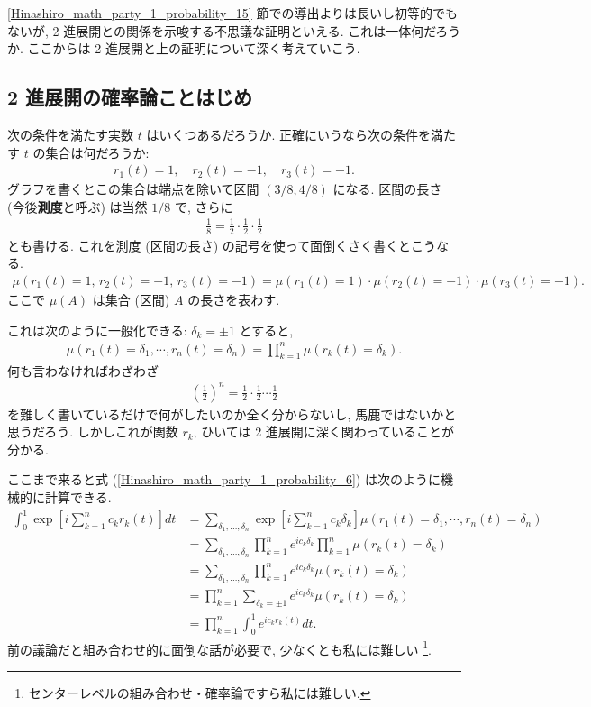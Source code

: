 \documentclass[openany, a4paper, oneside]{jsbook}
\theoremstyle{break}
\theoremstyle{breakdefn}
\newcommand{\rbk}[1]{\left (#1\right)}
\newcommand{\sqbk}[1]{\left[#1\right]}
\begin{document}
\ref{Hinashiro_math_party_1_probability_15} 節での導出よりは長いし初等的でもないが, 2 進展開との関係を示唆する不思議な証明といえる.
これは一体何だろうか.
ここからは 2 進展開と上の証明について深く考えていこう.
\subsection{2 進展開の確率論ことはじめ \label{Hinashiro_math_party_1_probability_14}}


次の条件を満たす実数 $t$ はいくつあるだろうか.
正確にいうなら次の条件を満たす $t$ の集合は何だろうか:
\begin{align}
 r_1 (t) = 1,
 \quad r_2 (t) = -1,
 \quad r_3 (t) = -1.
\end{align}
グラフを書くとこの集合は端点を除いて区間 $\rbk{3/8, 4/8}$ になる.
区間の長さ (今後\textbf{測度}と呼ぶ) は当然 $1/8$ で, さらに
\begin{align}
 \frac{1}{8}
 =
 \frac{1}{2} \cdot \frac{1}{2} \cdot \frac{1}{2}
\end{align}
とも書ける.
これを測度 (区間の長さ) の記号を使って面倒くさく書くとこうなる.
\begin{align}
 \mu \rbk{r_1 (t) = 1, \, r_2 (t) = -1, \, r_3 (t) = -1}
 =
 \mu \rbk{r_1 (t)=1} \cdot \mu \rbk{r_2 (t)=-1} \cdot \mu \rbk{r_3 (t)=-1}.
\end{align}
ここで $\mu (A)$ は集合 (区間) $A$ の長さを表わす.

これは次のように一般化できる: $\delta_k = \pm 1$ とすると,
\begin{align}
 \mu \rbk{r_1 (t) = \delta_1, \cdots, r_n (t) = \delta_n}
 =
 \prod_{k=1}^{n} \mu \rbk{r_k (t)=\delta_k}. \label{Hinashiro_math_party_1_probability_7}
\end{align}
何も言わなければわざわざ
\begin{align}
 \rbk{\frac{1}{2}}^n
 =
 \frac{1}{2} \cdot \frac{1}{2} \cdots \frac{1}{2}
\end{align}
を難しく書いているだけで何がしたいのか全く分からないし, 馬鹿ではないかと思うだろう.
しかしこれが関数 $r_k$, ひいては 2 進展開に深く関わっていることが分かる.

ここまで来ると式 (\ref{Hinashiro_math_party_1_probability_6}) は次のように機械的に計算できる.
\begin{align}
 \int_0^1 \exp \sqbk{i \sum_{k=1}^n c_k r_k (t)} dt
 &=
 \sum_{\delta_1,\dots,\delta_n} \exp \sqbk{i \sum_{k=1}^{n} c_k \delta_k} \mu \rbk{r_1 (t) = \delta_1, \cdots, r_n (t) = \delta_n} \\
 &=
 \sum_{\delta_1,\dots,\delta_n} \prod_{k=1}^n e^{i c_k \delta_k} \prod_{k=1}^n \mu \rbk{r_k (t) = \delta_k} \\
 &=
 \sum_{\delta_1,\dots,\delta_n} \prod_{k=1}^n e^{i c_k \delta_k} \mu \rbk{r_k (t) = \delta_k} \\
 &=
 \prod_{k=1}^n \sum_{\delta_k = \pm 1} e^{i c_k \delta_k} \mu \rbk{r_k (t) = \delta_k} \\
 &=
 \prod_{k=1}^n \int_0^1 e^{i c_k r_k (t)} dt.
\end{align}
前の議論だと組み合わせ的に面倒な話が必要で, 少なくとも私には難しい \footnote{センターレベルの組み合わせ・確率論ですら私には難しい.
 }.
\end{document}
